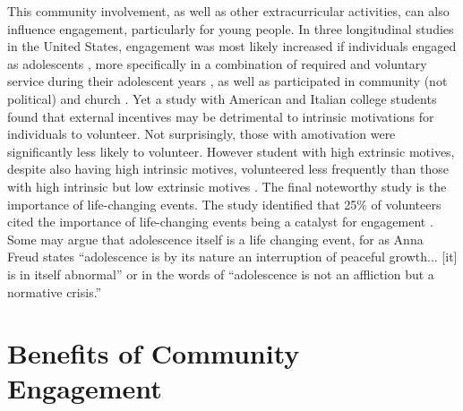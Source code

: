 This community involvement, as well as other extracurricular activities, can also influence engagement, particularly for young people. In three longitudinal studies in the United States, engagement was most likely increased if individuals engaged as adolescents \citep{Obradovic2007}, more specifically in a combination of required and voluntary service during their adolescent years \citep{Barber2013}, as well as participated in community (not political) and church \citep{Smetana2005}. Yet a study with American and Italian college students found that external incentives may be detrimental to intrinsic motivations for individuals to volunteer. Not surprisingly, those with amotivation were significantly less likely to volunteer. However student with high extrinsic motives, despite also having high intrinsic motives, volunteered less frequently than those with high intrinsic but low extrinsic motives \citep{Geiser2014}. The final noteworthy study is the importance of life-changing events. The study identified that 25\% of volunteers cited the importance of life-changing events being a catalyst for engagement \citep{Perry2008}. Some may argue that adolescence itself is a life changing event, for as Anna Freud \citeyearpar{Freud1958} states “adolescence is by its nature an interruption of peaceful growth... [it] is in itself abnormal” or in the words of \citet[][p72]{Erikson1956} “adolescence is not an affliction but a normative crisis.”





\section{Benefits of Community Engagement} 
